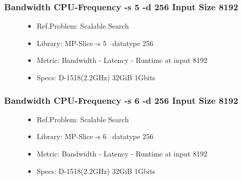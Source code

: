 \begin{frame}
    \frametitle{Bandwidth CPU-Frequency -s 5 -d 256 Input Size 8192}

    \begin{figure}
        \begin{itemize}
            \item Ref.Problem: Scalable Search
            \item Library: MP-Slice -s 5 --datatype 256
            \item Metric: Bandwidth - Latency - Runtime at input 8192
            \item Specs: D-1518(2.2GHz) 32GiB 1Gbits
        \end{itemize}
    \end{figure}

\end{frame}


\begin{frame}
    \frametitle{Bandwidth CPU-Frequency -s 6 -d 256 Input Size 8192}

    \begin{figure}
        \begin{itemize}
            \item Ref.Problem: Scalable Search
            \item Library: MP-Slice -s 6 --datatype 256
            \item Metric: Bandwidth - Latency - Runtime at input 8192
            \item Specs: D-1518(2.2GHz) 32GiB 1Gbits
        \end{itemize}
    \end{figure}

\end{frame}